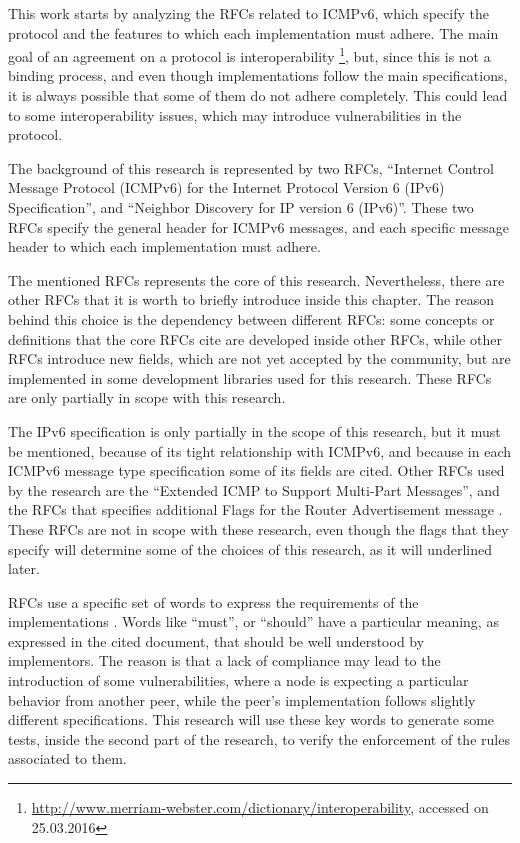\documentclass[12pt]{article}
\begin{document}
This work starts by analyzing the RFCs related to ICMPv6, which specify the protocol and the features to which each implementation must adhere. The main goal of an agreement on a protocol is interoperability \footnote{\url{http://www.merriam-webster.com/dictionary/interoperability}, accessed on 25.03.2016}, but, since this is not a binding process, and even though implementations follow the main specifications, it is always possible that some of them do not adhere completely. This could lead to some interoperability issues, which may introduce vulnerabilities in the protocol.

The background of this research is represented by two RFCs, ``Internet Control Message Protocol (ICMPv6) for the Internet Protocol Version 6 (IPv6) Specification''\cite{rfc4443}, and ``Neighbor Discovery for IP version 6 (IPv6)''\cite{rfc4861}. These two RFCs specify the general header for ICMPv6 messages, and each specific message header to which each implementation must adhere.

The mentioned RFCs represents the core of this research. Nevertheless, there are other RFCs that it is worth to briefly introduce inside this chapter. The reason behind this choice is the dependency between different RFCs: some concepts or definitions that the core RFCs cite are developed inside other RFCs, while other RFCs introduce new fields, which are not yet accepted by the community, but are implemented in some development libraries used for this research. These RFCs are only partially in scope with this research.

The IPv6 specification\cite{rfc2460} is only partially in the scope of this research, but it must be mentioned, because of its tight relationship with ICMPv6, and because in each ICMPv6 message type specification some of its fields are cited. Other RFCs used by the research are the ``Extended ICMP to Support Multi-Part Messages''\cite{rfc4884}, and the RFCs that specifies additional Flags for the Router Advertisement message \cite{rfc3775}\cite{rfc4191}\cite{rfc4389}. These RFCs are not in scope with these research, even though the flags that they specify will determine some of the choices of this research, as it will underlined later.

RFCs use a specific set of words to express the requirements of the implementations \cite{rfc2119}. Words like ``must'', or ``should'' have a particular meaning, as expressed in the cited document, that should be well understood by implementors. The reason is that a lack of compliance may lead to the introduction of some vulnerabilities, where a node is expecting a particular behavior from another peer, while the peer's implementation follows slightly different specifications. This research will use these key words to generate some tests, inside the second part of the research, to verify the enforcement of the rules associated to them.
\end{document}

